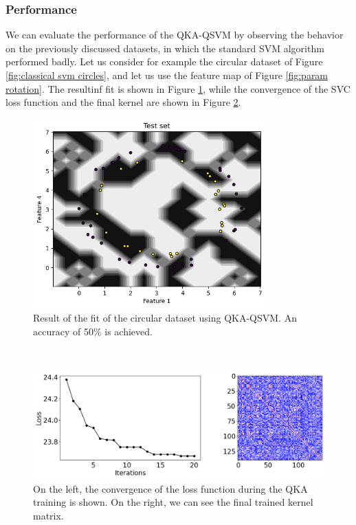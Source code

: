 \documentclass[12pt]{article}
\begin{document}
\subsubsection{Performance}
We can evaluate the performance of the QKA-QSVM by observing the behavior on the previously discussed datasets, in which the standard SVM algorithm performed badly. 
Let us consider for example the circular dataset of Figure \ref{fig:classical svm circles}, and let us use the feature map of Figure \ref{fig:param rotation}. 
The resultinf fit is shown in Figure \ref{fig:qka}, while the convergence of the SVC loss function and the final kernel are shown in Figure \ref{fig:loss function}.
\begin{figure}[h!]
    \centering
    \includegraphics[width=0.8\textwidth]{images/qka.png}
    \caption{Result of the fit of the circular dataset using QKA-QSVM. An accuracy of 50\% is achieved.}
    \label{fig:qka}
\end{figure}\\
 
\begin{figure}[h!]
    \centering
    \includegraphics[width=\textwidth]{images/lossfunction.png}
    \caption{On the left, the convergence of the loss function during the QKA training is shown. On the right, we can see the final trained kernel matrix.}
    \label{fig:loss function}
\end{figure}
\end{document}

